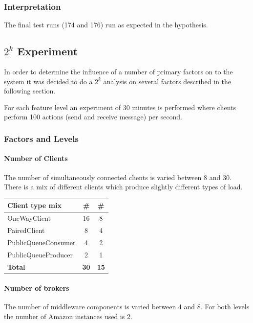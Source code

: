 \documentclass[milestone1.tex]{subfiles}
\begin{document}
\subsubsection{Interpretation}
The final test runs (174 and 176) run as expected in the hypothesis.

\subsection{$2^k$ Experiment}
In order to determine the influence of a number of primary factors on to the system it was decided to do a $2^k$ analysis on several factors described in the following section.

For each feature level an experiment of 30 minutes is performed where clients perform 100 actions (send and receive message) per second.

\subsubsection{Factors and Levels}

\paragraph{Number of Clients}
The number of simultaneously connected clients is varied between 8 and 30. There is a mix of different clients which produce slightly different types of load.

\begin{tabular}{|l|c|c|}
\hline 
\textbf{Client type mix } & \# & \# \\ 
\hline 
OneWayClient & 16 & 8  \\ 
\hline 
PairedClient & 8 & 4 \\ 
\hline 
PublicQueueConsumer & 4 & 2 \\ 
\hline 
PublicQueueProducer & 2 & 1 \\ 
\hline 
\textbf{Total}  & \textbf{30} & \textbf{15} \\
\hline 
\end{tabular} 

\paragraph{Number of brokers}

The number of middleware components is varied between 4 and 8. For both levels the number of Amazon instances used is 2.
\end{document}
